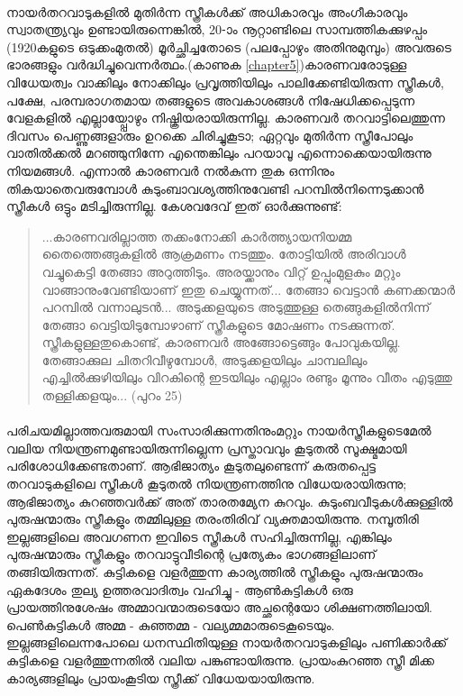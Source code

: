 \paragraph{}നായർതറവാടുകളിൽ മുതിർന്ന സ്ത്രീകൾക്ക് അധികാരവും അംഗീകാരവും സ്വാതന്ത്ര്യവും ഉണ്ടായിരുന്നെങ്കിൽ, 20-ാം നൂറ്റാണ്ടിലെ സാമ്പത്തികക്കുഴപ്പം (1920കളുടെ ഒടുക്കംമുതൽ) മൂർച്ഛിച്ചതോടെ (പലപ്പോഴും അതിനുമുമ്പും) അവരുടെ ഭാരങ്ങളും വർദ്ധിച്ചുവെന്നർത്ഥം.(കാണുക \ref{chapter5})കാരണവരോടുള്ള വിധേയത്വം വാക്കിലും നോക്കിലും പ്രവൃത്തിയിലും പാലിക്കേണ്ടിയിരുന്ന സ്ത്രീകൾ, പക്ഷേ, പരമ്പരാഗതമായ തങ്ങളുടെ അവകാശങ്ങൾ നിഷേധിക്കപ്പെടുന്ന വേളകളിൽ എല്ലായ്പ്പോഴും നിഷ്ക്രിയരായിരുന്നില്ല. കാരണവർ തറവാട്ടിലെത്തുന്ന ദിവസം പെണ്ണുങ്ങളാരും ഉറക്കെ ചിരിച്ചുകൂടാ; ഏറ്റവും മുതിർന്ന സ്ത്രീപോലും വാതിൽക്കൽ മറഞ്ഞുനിന്നേ എന്തെങ്കിലും പറയാവൂ എന്നൊക്കെയായിരുന്നു നിയമങ്ങൾ. എന്നാൽ കാരണവർ നൽകുന്ന തുക ഒന്നിനും തികയാതെവരുമ്പോൾ കുടുംബാവശ്യത്തിനുവേണ്ടി പറമ്പിൽനിന്നെടുക്കാൻ സ്ത്രീകൾ ഒട്ടും മടിച്ചിരുന്നില്ല. കേശവദേവ് ഇത് ഓർക്കുന്നുണ്ട്:
\begin{quotation}
\noindent...കാരണവരില്ലാത്ത തക്കംനോക്കി കാർത്ത്യായനിയമ്മ തൈത്തെങ്ങുകളിൽ ആക്രമണം നടത്തും. തോട്ടിയിൽ അരിവാൾ വച്ചുകെട്ടി തേങ്ങാ അറുത്തിടും. അരയ്ക്കാനും വിറ്റ് ഉപ്പുംമുളകും മറ്റും വാങ്ങാനുംവേണ്ടിയാണ് ഇതു ചെയ്യുന്നത്... തേങ്ങാ വെട്ടാൻ കണക്കന്മാർ പറമ്പിൽ വന്നാലുടൻ... അടുക്കളയുടെ അടുത്തുള്ള തെങ്ങുകളിൽനിന്ന് തേങ്ങാ വെട്ടിയിടുമ്പോഴാണ് സ്ത്രീകളുടെ മോഷണം നടക്കുന്നത്. സ്ത്രീകളുള്ളതുകൊണ്ട്, കാരണവർ അങ്ങോട്ടെങ്ങും പോവുകയില്ല. തേങ്ങാക്കുല ചിതറിവീഴുമ്പോൾ, അടുക്കളയിലും ചാമ്പലിലും എച്ചിൽക്കുഴിയിലും വിറകിന്റെ ഇടയിലും എല്ലാം രണ്ടും മൂന്നും വീതം എടുത്തു തള്ളിക്കളയും... (പുറം 25)

\end{quotation}

\paragraph{}പരിചയമില്ലാത്തവരുമായി സംസാരിക്കുന്നതിനുംമറ്റും നായർസ്ത്രീകളുടെമേൽ വലിയ നിയന്ത്രണമുണ്ടായിരുന്നില്ലെന്ന പ്രസ്താവവും കൂടുതൽ സൂക്ഷ്മമായി പരിശോധിക്കേണ്ടതാണ്. ആഭിജാത്യം കൂടുതലുണ്ടെന്ന് കരുതപ്പെട്ട തറവാടുകളിലെ സ്ത്രീകൾ കൂടുതൽ നിയന്ത്രണത്തിനു വിധേയരായിരുന്നു; ആഭിജാത്യം കുറഞ്ഞവർക്ക് അത് താരതമ്യേന കുറവും. കുടുംബവീടുകൾക്കുള്ളിൽ പുരുഷന്മാരും സ്ത്രീകളും തമ്മിലുള്ള തരംതിരിവ് വ്യക്തമായിരുന്നു. നമ്പൂതിരി ഇല്ലങ്ങളിലെ അവഗണന ഇവിടെ സ്ത്രീകൾ സഹിച്ചിരുന്നില്ല, എങ്കിലും പുരുഷന്മാരും സ്ത്രീകളും തറവാട്ടുവീടിന്റെ പ്രത്യേകം ഭാഗങ്ങളിലാണ് തങ്ങിയിരുന്നത്. കുട്ടികളെ വളർത്തുന്ന കാര്യത്തിൽ സ്ത്രീകളും പുരുഷന്മാരും ഏകദേശം തുല്യ ഉത്തരവാദിത്വം വഹിച്ചു - ആൺകുട്ടികൾ ഒരു പ്രായത്തിനുശേഷം അമ്മാവന്മാരുടെയോ അച്ഛന്റെയോ ശിക്ഷണത്തിലായി. പെൺകുട്ടികൾ അമ്മ - കുഞ്ഞമ്മ - വല്യമ്മമാരുടെകൂടെയും. ഇല്ലങ്ങളിലെന്നപോലെ ധനസ്ഥിതിയുള്ള നായർതറവാടുകളിലും പണിക്കാർക്ക് കുട്ടികളെ വളർത്തുന്നതിൽ വലിയ പങ്കുണ്ടായിരുന്നു. പ്രായംകുറഞ്ഞ സ്ത്രീ മിക്ക കാര്യങ്ങളിലും പ്രായംകൂടിയ സ്ത്രീക്ക് വിധേയയായിരുന്നു.


